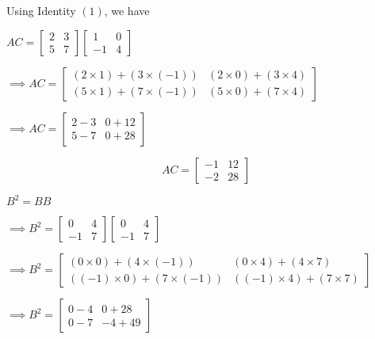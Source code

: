 \documentclass[journal,12pt,twocolumn]{IEEEtran}
\begin{document}
    Using Identity $(1)$, we have

    $
      AC=
      \begin{bmatrix}
        2 & 3 \\
        5 & 7
      \end{bmatrix}
      \begin{bmatrix}
        1 & 0 \\
        -1 & 4
      \end{bmatrix}
      $

      $\implies AC=
      \begin{bmatrix}
        (2\times1)+(3\times(-1)) & (2\times0)+(3\times4) \\
        (5\times1)+(7\times(-1)) & (5\times0)+(7\times4)
      \end{bmatrix}
      $

      $\implies AC=
      \begin{bmatrix}
        2-3 & 0+12 \\
        5-7 & 0+28
      \end{bmatrix}
      $

      \begin{equation}
        \boxed{AC=
        \begin{bmatrix}
          -1 & 12 \\
          -2 & 28 
        \end{bmatrix}
        }
      \end{equation}

    
    $
      B^2=BB
      $

      $\implies B^2=
      \begin{bmatrix}
        0 & 4 \\
        -1 & 7
      \end{bmatrix}
      \begin{bmatrix}
        0 & 4 \\
        -1 & 7
      \end{bmatrix}
     $

      $\implies B^2=
      \begin{bmatrix}
        (0\times0)+(4\times(-1)) & (0\times4)+(4\times7) \\
        ((-1)\times0)+(7\times(-1)) & ((-1)\times4)+(7\times7)
      \end{bmatrix}
      $

      $\implies B^2=
      \begin{bmatrix}
        0-4 & 0+28 \\
        0-7 & -4+49
      \end{bmatrix}
      $
\end{document}
